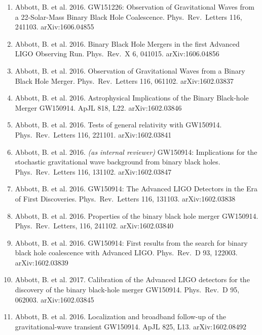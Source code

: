 \documentclass[margin,line]{res}
\begin{document}
\begin{resume}
\begin{enumerate}
\item Abbott, B. et al. 2016.  GW151226: Observation of Gravitational Waves from a 22-Solar-Mass Binary Black Hole Coalescence.  Phys.~Rev.~Letters 116, 241103.  	arXiv:1606.04855

\item Abbott, B. et al. 2016.  Binary Black Hole Mergers in the first Advanced LIGO Observing Run.  Phys.~Rev.~X 6, 041015.  	arXiv:1606.04856

\item Abbott, B. et al. 2016.  Observation of Gravitational Waves from a Binary Black Hole Merger.  Phys.~Rev.~Letters 116, 061102.  arXiv:1602.03837

\item Abbott, B. et al. 2016.  Astrophysical Implications of the Binary Black-hole Merger GW150914.  ApJL 818, L22. arXiv:1602.03846

\item Abbott, B. et al. 2016. Tests of general relativity with GW150914. Phys.~Rev.~Letters 116, 221101. arXiv:1602.03841

\item Abbott, B. et al. 2016.  {\it (as internal reviewer)}   GW150914: Implications for the stochastic gravitational wave background from binary black holes.  Phys.~Rev.~Letters 116, 131102.  arXiv:1602.03847

\item Abbott, B. et al. 2016. GW150914: The Advanced LIGO Detectors in the Era of First Discoveries.   Phys.~Rev.~Letters 116, 131103.  arXiv:1602.03838

\item Abbott, B. et al. 2016. Properties of the binary black hole merger GW150914.   Phys.~Rev.~Letters, 116, 241102.  arXiv:1602.03840

\item Abbott, B. et al. 2016. GW150914: First results from the search for binary black hole coalescence with Advanced LIGO.  Phys.~Rev.~D 93, 122003.  arXiv:1602.03839

\item Abbott, B. et al. 2017. Calibration of the Advanced LIGO detectors for the discovery of the binary black-hole merger GW150914.   Phys.~Rev.~D 95, 062003.  arXiv:1602.03845

\item Abbott, B. et al. 2016. Localization and broadband follow-up of the gravitational-wave transient GW150914.   ApJL 825, L13. arXiv:1602.08492


\end{enumerate}
\end{resume}
\end{document}
